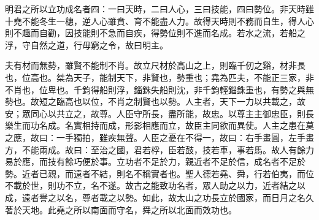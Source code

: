 
\begin{pinyinscope}
明君之所以立功成名者四：一曰天時，二曰人心，三曰技能，四曰勢位。非天時雖十堯不能冬生一穗，逆人心雖賁、育不能盡人力。故得天時則不務而自生，得人心則不趣而自勸，因技能則不急而自疾，得勢位則不進而名成。若水之流，若船之浮，守自然之道，行毋窮之令，故曰明主。

夫有材而無勢，雖賢不能制不肖。故立尺材於高山之上，則臨千仞之谿，材非長也，位高也。桀為天子，能制天下，非賢也，勢重也；堯為匹夫，不能正三家，非不肖也，位卑也。千鈞得船則浮，錙銖失船則沈，非千鈞輕錙銖重也，有勢之與無勢也。故短之臨高也以位，不肖之制賢也以勢。人主者，天下一力以共載之，故安；眾同心以共立之，故尊。人臣守所長，盡所能，故忠。以尊主主御忠臣，則長樂生而功名成。名實相持而成，形影相應而立，故臣主同欲而異使。人主之患在莫之應，故曰：一手獨拍，雖疾無聲。人臣之憂在不得一，故曰：右手畫圓，左手畫方，不能兩成。故曰：至治之國，君若桴，臣若鼓，技若車，事若馬。故人有餘力易於應，而技有餘巧便於事。立功者不足於力，親近者不足於信，成名者不足於勢。近者已親，而遠者不結，則名不稱實者也。聖人德若堯、舜，行若伯夷，而位不載於世，則功不立，名不遂。故古之能致功名者，眾人助之以力，近者結之以成，遠者譽之以名，尊者載之以勢。如此，故太山之功長立於國家，而日月之名久著於天地。此堯之所以南面而守名，舜之所以北面而效功也。


\end{pinyinscope}